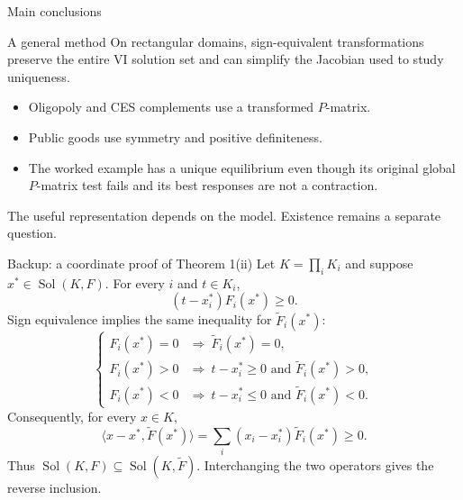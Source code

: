 \documentclass[11pt,aspectratio=169]{beamer}
\theoremstyle{plain}
\theoremstyle{definition}
\newcommand{\compactmath}{%
 \setlength{\abovedisplayskip}{4pt}\setlength{\belowdisplayskip}{4pt}%
 \setlength{\abovedisplayshortskip}{2pt}\setlength{\belowdisplayshortskip}{4pt}}
\begin{document}
\begin{frame}{Main conclusions}
\begin{block}{A general method}
On rectangular domains, sign-equivalent transformations preserve the entire VI
solution set and can simplify the Jacobian used to study uniqueness.
\end{block}
\begin{itemize}
 \item Oligopoly and CES complements use a transformed $P$-matrix.
 \item Public goods use symmetry and positive definiteness.
 \item The worked example has a unique equilibrium even though its original
 global $P$-matrix test fails and its best responses are not a contraction.
\end{itemize}
\medskip
The useful representation depends on the model. Existence remains a separate question.
\end{frame}

\appendix

\begin{frame}{Backup: a coordinate proof of Theorem 1(ii)}
\small\compactmath
Let $K=\prod_i K_i$ and suppose $x^*\in\operatorname{Sol}(K,F)$.
For every $i$ and $t\in K_i$,
\[
 (t-x_i^*)F_i(x^*)\geq0.
\]
Sign equivalence implies the same inequality for $\widetilde F_i(x^*)$:
\[
 \begin{cases}
 F_i(x^*)=0 &\Longrightarrow\ \widetilde F_i(x^*)=0,\\
 F_i(x^*)>0 &\Longrightarrow\ t-x_i^*\geq0\text{ and }\widetilde F_i(x^*)>0,\\
 F_i(x^*)<0 &\Longrightarrow\ t-x_i^*\leq0\text{ and }\widetilde F_i(x^*)<0.
 \end{cases}
\]
Consequently, for every $x\in K$,
\[
 \langle x-x^*,\widetilde F(x^*)\rangle
 =\sum_i(x_i-x_i^*)\widetilde F_i(x^*)\geq0.
\]
Thus $\operatorname{Sol}(K,F)\subseteq\operatorname{Sol}(K,\widetilde F)$.
Interchanging the two operators gives the reverse inclusion.
\end{frame}
\end{document}
